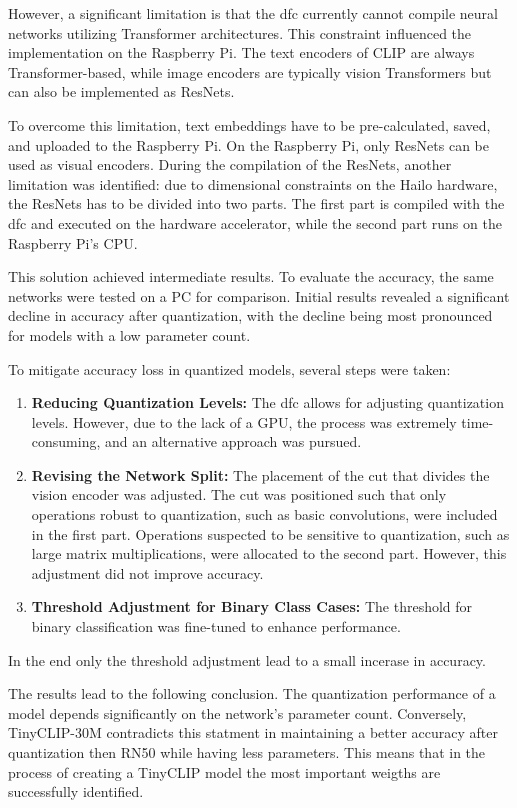 However, a significant limitation is that the \acrshort{dfc} currently cannot compile neural networks utilizing Transformer architectures.  
This constraint influenced the implementation on the Raspberry Pi.  
The text encoders of CLIP are always Transformer-based, while image encoders are typically vision Transformers but can also be implemented as ResNets.  

To overcome this limitation, text embeddings have to be pre-calculated, saved, and uploaded to the Raspberry Pi.  
On the Raspberry Pi, only ResNets can be used as visual encoders.  
During the compilation of the ResNets, another limitation was identified: due to dimensional constraints on the Hailo hardware, the ResNets has to be divided into two parts.  
The first part is compiled with the \acrshort{dfc} and executed on the hardware accelerator, while the second part runs on the Raspberry Pi's CPU.  

This solution achieved intermediate results.  
To evaluate the accuracy, the same networks were tested on a PC for comparison.  
Initial results revealed a significant decline in accuracy after quantization, with the decline being most pronounced for models with a low parameter count.  

To mitigate accuracy loss in quantized models, several steps were taken:  
\begin{enumerate}  
    \item \textbf{Reducing Quantization Levels:} The \acrshort{dfc} allows for adjusting quantization levels.  
    However, due to the lack of a GPU, the process was extremely time-consuming, and an alternative approach was pursued.  
    \item \textbf{Revising the Network Split:} The placement of the cut that divides the vision encoder was adjusted.  
    The cut was positioned such that only operations robust to quantization, such as basic convolutions, were included in the first part.  
    Operations suspected to be sensitive to quantization, such as large matrix multiplications, were allocated to the second part.  
    However, this adjustment did not improve accuracy.  
    \item \textbf{Threshold Adjustment for Binary Class Cases:} The threshold for binary classification was fine-tuned to enhance performance.  
\end{enumerate}  
In the end only the threshold adjustment lead to a small incerase in accuracy.

The results lead to the following conclusion.
The quantization performance of a model depends significantly on the network's parameter count.
Conversely, TinyCLIP-30M contradicts this statment in maintaining a better accuracy after quantization then RN50 while having less parameters.  
This means that in the process of creating a TinyCLIP model the most important weigths are successfully identified.


